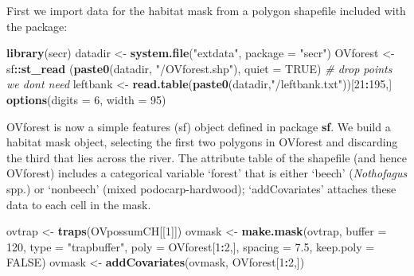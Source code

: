 \documentclass[
]{book}
\newenvironment{Shaded}{\begin{snugshade}}{\end{snugshade}}
\newcommand{\AttributeTok}[1]{\textcolor[rgb]{0.13,0.29,0.53}{#1}}
\newcommand{\CommentTok}[1]{\textcolor[rgb]{0.56,0.35,0.01}{\textit{#1}}}
\newcommand{\ConstantTok}[1]{\textcolor[rgb]{0.56,0.35,0.01}{#1}}
\newcommand{\DecValTok}[1]{\textcolor[rgb]{0.00,0.00,0.81}{#1}}
\newcommand{\FloatTok}[1]{\textcolor[rgb]{0.00,0.00,0.81}{#1}}
\newcommand{\FunctionTok}[1]{\textcolor[rgb]{0.13,0.29,0.53}{\textbf{#1}}}
\newcommand{\NormalTok}[1]{#1}
\newcommand{\OtherTok}[1]{\textcolor[rgb]{0.56,0.35,0.01}{#1}}
\newcommand{\SpecialCharTok}[1]{\textcolor[rgb]{0.81,0.36,0.00}{\textbf{#1}}}
\newcommand{\StringTok}[1]{\textcolor[rgb]{0.31,0.60,0.02}{#1}}
\begin{document}
First we import data for the habitat mask from a polygon shapefile included with the package:

\begin{Shaded}
\begin{Highlighting}[]
\FunctionTok{library}\NormalTok{(secr)}
\NormalTok{datadir }\OtherTok{\textless{}{-}} \FunctionTok{system.file}\NormalTok{(}\StringTok{"extdata"}\NormalTok{, }\AttributeTok{package =} \StringTok{"secr"}\NormalTok{)}
\NormalTok{OVforest }\OtherTok{\textless{}{-}}\NormalTok{ sf}\SpecialCharTok{::}\FunctionTok{st\_read}\NormalTok{ (}\FunctionTok{paste0}\NormalTok{(datadir, }\StringTok{"/OVforest.shp"}\NormalTok{), }
    \AttributeTok{quiet =} \ConstantTok{TRUE}\NormalTok{)}
\CommentTok{\# drop points we don\textquotesingle{}t need}
\NormalTok{leftbank }\OtherTok{\textless{}{-}} \FunctionTok{read.table}\NormalTok{(}\FunctionTok{paste0}\NormalTok{(datadir,}\StringTok{"/leftbank.txt"}\NormalTok{))[}\DecValTok{21}\SpecialCharTok{:}\DecValTok{195}\NormalTok{,]  }
\FunctionTok{options}\NormalTok{(}\AttributeTok{digits =} \DecValTok{6}\NormalTok{, }\AttributeTok{width =} \DecValTok{95}\NormalTok{)       }
\end{Highlighting}
\end{Shaded}

OVforest is now a simple features (sf) object defined in package \textbf{sf}. We build a habitat mask object, selecting the first two polygons in OVforest and discarding the third that lies across the river. The attribute table of the shapefile (and hence OVforest) includes a categorical variable `forest' that is either `beech' (\emph{Nothofagus} spp.) or `nonbeech' (mixed podocarp-hardwood); `addCovariates' attaches these data to each cell in the mask.

\begin{Shaded}
\begin{Highlighting}[]
\NormalTok{ovtrap }\OtherTok{\textless{}{-}} \FunctionTok{traps}\NormalTok{(OVpossumCH[[}\DecValTok{1}\NormalTok{]])}
\NormalTok{ovmask }\OtherTok{\textless{}{-}} \FunctionTok{make.mask}\NormalTok{(ovtrap, }\AttributeTok{buffer =} \DecValTok{120}\NormalTok{, }\AttributeTok{type =} \StringTok{"trapbuffer"}\NormalTok{,}
    \AttributeTok{poly =}\NormalTok{ OVforest[}\DecValTok{1}\SpecialCharTok{:}\DecValTok{2}\NormalTok{,], }\AttributeTok{spacing =} \FloatTok{7.5}\NormalTok{, }\AttributeTok{keep.poly =} \ConstantTok{FALSE}\NormalTok{)}
\NormalTok{ovmask }\OtherTok{\textless{}{-}} \FunctionTok{addCovariates}\NormalTok{(ovmask, OVforest[}\DecValTok{1}\SpecialCharTok{:}\DecValTok{2}\NormalTok{,])}
\end{Highlighting}
\end{Shaded}
\end{document}
